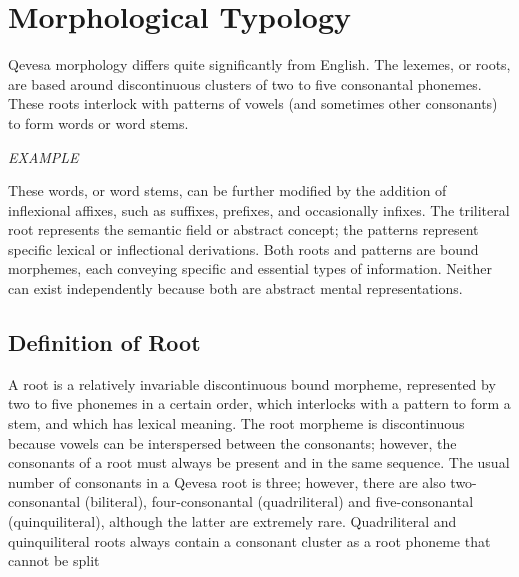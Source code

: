 \documentclass[grammar]{subfiles}
\begin{document}
  \chapter{Morphological Typology}
  \label{ch:morphological_typology}


  Qevesa morphology differs quite significantly from English. The lexemes, or roots, are based around discontinuous clusters of two to five consonantal phonemes. These roots interlock with patterns of vowels (and sometimes other consonants) to form words or word stems.

  \begin{exe}
    \ex \emph{EXAMPLE}
  \end{exe}

  These words, or word stems, can be further modified by the addition of inflexional affixes, such as suffixes, prefixes, and occasionally infixes. The triliteral root represents the semantic field or abstract concept; the patterns represent specific lexical or inflectional derivations. Both roots and patterns are bound morphemes, each conveying specific and essential types of information. Neither can exist independently because both are abstract mental representations. 

  \section{Definition of Root}
  \label{sec:definition_of_root}

  A root is a relatively invariable discontinuous bound morpheme, represented by two to five phonemes in a certain order, which interlocks with a pattern to form a stem, and which has lexical meaning. The root morpheme is discontinuous because vowels can be interspersed between the consonants; however, the consonants of a root must always be present and in the same sequence. The usual number of consonants in a Qevesa root is three; however, there are also two-consonantal (biliteral), four-consonantal (quadriliteral) and five-consonantal (quinquiliteral), although the latter are extremely rare. Quadriliteral and quinquiliteral roots always contain a consonant cluster as a root phoneme that cannot be split
\end{document}
